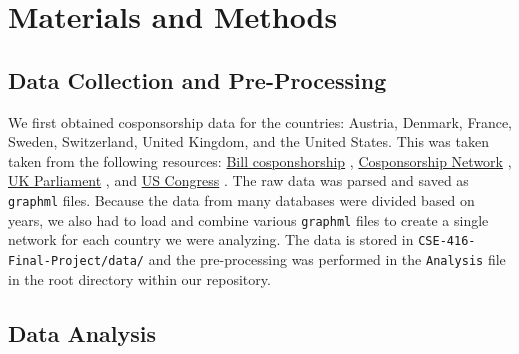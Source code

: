 \documentclass[12pt]{article}
\begin{document}
\section{Materials and Methods}

\subsection{Data Collection and Pre-Processing}
We first obtained cosponsorship data for the countries: Austria, Denmark, France, Sweden, Switzerland, United Kingdom, and the United States. This was taken taken from the following resources: \underline{Bill cosponshorship} \cite{briatte}, \underline{Cosponsorship Network} \cite{fowler}, \underline{UK Parliament} \cite{UK}, and \underline{US Congress} \cite{US}. The raw data was parsed and saved as \texttt{graphml} files. Because the data from many databases were divided based on years, we also had to load and combine various \texttt{graphml} files to create a single network for each country we were analyzing. The data is stored in \texttt{CSE-416-Final-Project/data/} and the pre-processing was performed in the \texttt{Analysis} file in the root directory within our repository.

\subsection{Data Analysis}
\end{document}
